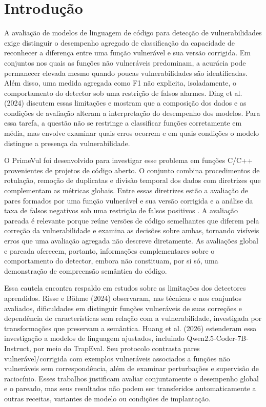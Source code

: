 \section{Introdução}
\label{sec:introducao}

A avaliação de modelos de linguagem de código para detecção de vulnerabilidades exige distinguir o desempenho agregado de classificação da capacidade de reconhecer a diferença entre uma função vulnerável e sua versão corrigida. Em conjuntos nos quais as funções não vulneráveis predominam, a acurácia pode permanecer elevada mesmo quando poucas vulnerabilidades são identificadas. Além disso, uma medida agregada como F1 não explicita, isoladamente, o comportamento do detector sob uma restrição de falsos alarmes. Ding et al. (2024) discutem essas limitações e mostram que a composição dos dados e as condições de avaliação alteram a interpretação do desempenho dos modelos. Para essa tarefa, a questão não se restringe a classificar funções corretamente em média, mas envolve examinar quais erros ocorrem e em quais condições o modelo distingue a presença da vulnerabilidade.

O PrimeVul foi desenvolvido para investigar esse problema em funções C/C++ provenientes de projetos de código aberto. O conjunto combina procedimentos de rotulação, remoção de duplicatas e divisão temporal dos dados com diretrizes que complementam as métricas globais. Entre essas diretrizes estão a avaliação de pares formados por uma função vulnerável e sua versão corrigida e a análise da taxa de falsos negativos sob uma restrição de falsos positivos \cite{ding2024primevul}. A avaliação pareada é relevante porque reúne versões de código semelhantes que diferem pela correção da vulnerabilidade e examina as decisões sobre ambas, tornando visíveis erros que uma avaliação agregada não descreve diretamente. As avaliações global e pareada oferecem, portanto, informações complementares sobre o comportamento do detector, embora não constituam, por si só, uma demonstração de compreensão semântica do código.

Essa cautela encontra respaldo em estudos sobre as limitações dos detectores aprendidos. Risse e Böhme (2024) observaram, nas técnicas e nos conjuntos avaliados, dificuldades em distinguir funções vulneráveis de suas correções e dependência de características sem relação com a vulnerabilidade, investigada por transformações que preservam a semântica. Huang et al. (2026) estenderam essa investigação a modelos de linguagem ajustados, incluindo Qwen2.5-Coder-7B-Instruct, por meio do TrapEval. Seu protocolo contrasta pares vulnerável/corrigida com exemplos vulneráveis associados a funções não vulneráveis sem correspondência, além de examinar perturbações e supervisão de raciocínio. Esses trabalhos justificam avaliar conjuntamente o desempenho global e o pareado, mas seus resultados não podem ser transferidos automaticamente a outras receitas, variantes de modelo ou condições de implantação.

